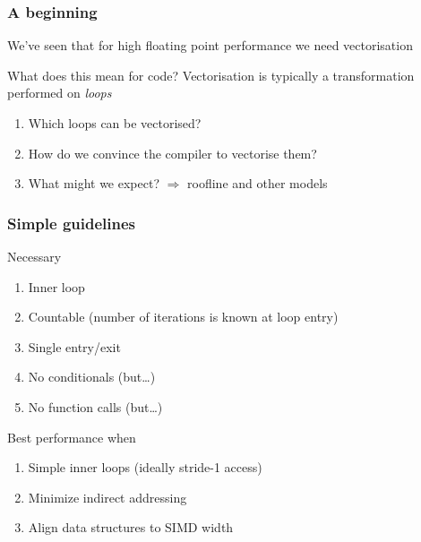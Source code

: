 \documentclass[presentation,aspectratio=43,10pt]{beamer}
\date{}
\begin{document}
\begin{frame}
  \maketitle
\end{frame}

\begin{frame}[fragile]
  \frametitle{A beginning}
  We've seen that for high floating point performance we need
  vectorisation

  \begin{challenge}{What does this mean for code?}
    Vectorisation is typically a transformation performed on \emph{loops}
    \begin{enumerate}
    \item Which loops can be vectorised?
    \item How do we convince the compiler to vectorise them?
    \item What might we expect? $\Rightarrow$ roofline and other models
    \end{enumerate}
  \end{challenge}
\end{frame}

\begin{frame}
  \frametitle{Simple guidelines}
  \begin{challenge}{Necessary}
    \begin{enumerate}
    \item Inner loop
    \item Countable (number of iterations is known at loop entry)
    \item Single entry/exit
    \item No conditionals (but\dots)
    \item No function calls (but\dots)
    \end{enumerate}
  \end{challenge}
  \begin{exampleblock}{Best performance when}
    \begin{enumerate}
    \item Simple inner loops (ideally stride-1 access)
    \item Minimize indirect addressing
    \item Align data structures to SIMD width
    \end{enumerate}
  \end{exampleblock}
\end{frame}
\end{document}
